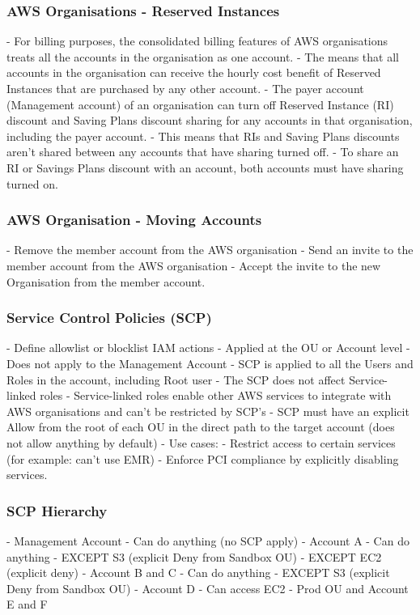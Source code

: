 \documentclass[11pt]{book}
\begin{document}
    \subsubsection{AWS Organisations - Reserved Instances}
    - For billing purposes, the consolidated billing features of AWS organisations treats all the accounts in the organisation as one account.
    - The means that all accounts in the organisation can receive the hourly cost benefit of Reserved Instances that are purchased by any other account.
    - The payer account (Management account) of an organisation can turn off Reserved Instance (RI) discount and Saving Plans discount sharing for any accounts in that organisation, including the payer account.
    - This means that RIs and Saving Plans discounts aren't shared between any accounts that have sharing turned off.
    - To share an RI or Savings Plans discount with an account, both accounts must have sharing turned on.

    \subsubsection{AWS Organisation - Moving Accounts}
    - Remove the member account from the AWS organisation
    - Send an invite to the member account from the AWS organisation
    - Accept the invite to the new Organisation from the member account.

    \subsubsection{Service Control Policies (SCP)}
    - Define allowlist or blocklist IAM actions
    - Applied at the OU or Account level
    - Does not apply to the Management Account
    - SCP is applied to all the Users and Roles in the account, including Root user
    - The SCP does not affect Service-linked roles
    - Service-linked roles enable other AWS services to integrate with AWS organisations and can't be restricted by SCP's
    - SCP must have an explicit Allow from the root of each OU in the direct path to the target account (does not allow anything by default)
    - Use cases:
    - Restrict access to certain services (for example: can't use EMR)
    - Enforce PCI compliance by explicitly disabling services.

    \subsubsection{SCP Hierarchy}
    - Management Account - Can do anything (no SCP apply)
    - Account A
    - Can do anything
    - EXCEPT S3 (explicit Deny from Sandbox OU)
    - EXCEPT EC2 (explicit deny)
    - Account B and C
    - Can do anything
    - EXCEPT S3 (explicit Deny from Sandbox OU)
    - Account D
    - Can access EC2
    - Prod OU and Account E and F
\end{document}
